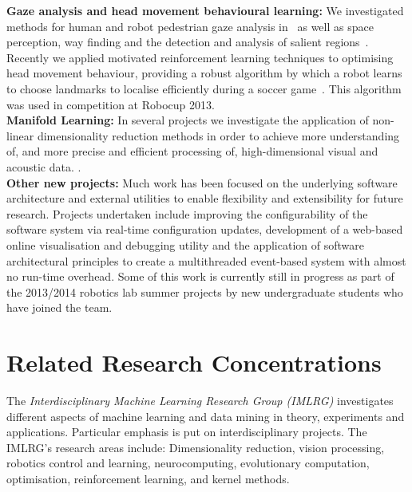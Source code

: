 \documentclass{llncs}
\begin{document}
\noindent\textbf{Gaze analysis and head movement behavioural learning:} We investigated methods for human and robot pedestrian gaze analysis in~\cite{JalalianEtAl_CAADRIA2011,WongEtAl2012} as well as space perception, way finding and the detection and analysis of salient regions~\cite{BhatiaChalup2013,BhatiaEtAl2013,BhatiaChalupOstwald2013}. Recently we  applied motivated reinforcement learning techniques to optimising head movement behaviour, providing a robust algorithm by which a robot learns to choose landmarks to localise efficiently during a soccer game~\cite{FountainEtAl2014}. This algorithm was used in competition at Robocup 2013.
\\

\noindent\textbf{Manifold Learning:} In several projects we
investigate the application of non-linear dimensionality reduction
methods in order to achieve more understanding of, and more precise
and efficient processing of, high-dimensional visual and acoustic data.
\cite{ChalupEtAl2007b,WongChalup_WCCI_2008,WongEtAl2012}.%
\\

\noindent\textbf{Other new projects:} Much work has been focused on the underlying software architecture and external utilities to enable flexibility and extensibility for future research. Projects undertaken include improving the configurability of the software system via real-time configuration updates, development of a web-based online visualisation and debugging utility \cite{AnnableEtAl2014} and the application of software architectural principles to create a multithreaded event-based system with almost no run-time overhead. Some of this work is currently still in progress as part of the 2013/2014 robotics lab summer projects by new undergraduate students who have joined the team.

\section{Related Research Concentrations}

The \emph{Interdisciplinary Machine Learning Research Group (IMLRG)} investigates different aspects of machine learning and data mining in theory, experiments and applications. Particular emphasis is put on interdisciplinary projects. The IMLRG's research areas include: Dimensionality reduction, vision processing, robotics control and learning, neurocomputing, evolutionary computation, optimisation, reinforcement learning, and kernel methods.
\end{document}
